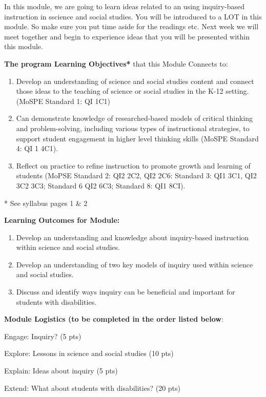 \documentclass[11.5pt]{sig-alternate} %
\begin{document}
\begin{large}
In this module, we are going to learn ideas related to an using inquiry-based instruction in sscience and social studies. You will be introduced to a LOT in this module. So make sure you put time aside for the readings etc. Next week we will meet together and begin to experience ideas that you will be presented within this module.

\textbf{The program Learning Objectives*} that this Module Connects to:

\begin{enumerate}
    \item Develop an understanding of science and social studies content and connect those ideas to the teaching of science or social studies in the K-12 setting. (MoSPE Standard 1: QI 1C1)
    \item Can demonstrate knowledge of researched-based models of critical thinking and problem-solving, including various types of instructional strategies, to support student engagement in higher level thinking skills (MoSPE Standard 4: QI 1 4C1).
    \item Reflect on practice to refine instruction to promote growth and learning of students (MoPSE Standard 2: QI2 2C2, QI2 2C6: Standard 3: QI1 3C1, QI2 3C2 3C3; Standard 6 QI2 6C3; Standard 8: QI1 8CI).
\end{enumerate}

* See syllabus pages 1 \& 2

\textbf{Learning Outcomes for Module:}

\begin{enumerate}
    \item Develop an understanding and knowledge about inquiry-based instruction within science and social studies.
    \item Develop an understanding of two key models of inquiry used within science and social studies.
    \item Discuss and identify ways inquiry can be beneficial and important for students with disabilities.
\end{enumerate}

\textbf{Module Logistics (to be completed in the order listed below}:

Engage: Inquiry? (5 pts)

Explore: Lessons in science and social studies (10 pts)

Explain: Ideas about inquiry (5 pts)

Extend: What about students with disabilities? (20 pts)


\end{large}
\end{document}
